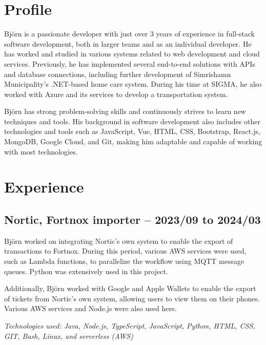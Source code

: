 \documentclass{article}
\begin{document}
	\noindent
	\begin{minipage}[t]{0.7\textwidth}
		\vspace{-20pt} %
		\section*{\textcolor{colorBlue}{Profile}}
		Björn is a passionate developer with just over 3 years of experience in full-stack software development, both in larger teams and as an individual developer. He has worked and studied in various systems related to web development and cloud services. Previously, he has implemented several end-to-end solutions with APIs and database connections, including further development of Simrishamn Municipality's .NET-based home care system. During his time at SIGMA, he also worked with Azure and its services to develop a transportation system.
		
		\vspace{10pt}
		Björn has strong problem-solving skills and continuously strives to learn new techniques and tools. His background in software development also includes other technologies and tools such as JavaScript, Vue, HTML, CSS, Bootstrap, React.js, MongoDB, Google Cloud, and Git, making him adaptable and capable of working with most technologies.
		
		\vspace{10pt} %
		\section*{\textcolor{colorBlue}{Experience}}
		
		\subsection*{\textcolor{colorTitelErfarenhet}{Nortic, Fortnox importer – 2023/09 to 2024/03}}
		Björn worked on integrating Nortic's own system to enable the export of transactions to Fortnox. During this period, various AWS services were used, such as Lambda functions, to parallelize the workflow using MQTT message queues. Python was extensively used in this project.
		
		Additionally, Björn worked with Google and Apple Wallets to enable the export of tickets from Nortic's own system, allowing users to view them on their phones. Various AWS services and Node.js were also used here.
		
		\vspace{5pt}\textit{Technologies used: Java, Node.js, TypeScript, JavaScript, Python, HTML, CSS, GIT, Bash, Linux, and serverless (AWS)}
		

\end{minipage}
\end{document}
